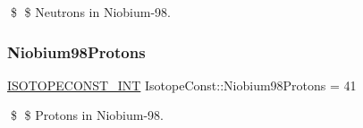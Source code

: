 \$ \$ Neutrons in Niobium-\/98. \mbox{\label{group___isotope_const-_niobium-_nb98_ga11a2f01acf32259029e45c499c7548d3}} 
\subsubsection{\texorpdfstring{Niobium98\+Protons}{Niobium98Protons}}
{\footnotesize\ttfamily \mbox{\hyperlink{group___isotope_const-_macros_ga5f18360b3e99483a35c32d789e62621c}{I\+S\+O\+T\+O\+P\+E\+C\+O\+N\+S\+T\+\_\+\+I\+NT}} Isotope\+Const\+::\+Niobium98\+Protons = 41}

\$ \$ Protons in Niobium-\/98. 